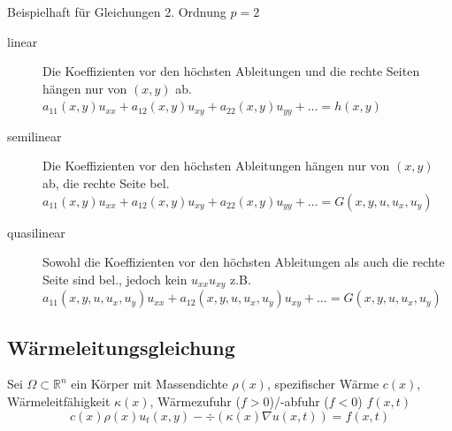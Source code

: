 \begin{sectionbox}
    Beispielhaft für Gleichungen 2. Ordnung $p=2$
    \begin{description}
        \item[linear] Die Koeffizienten vor den höchsten Ableitungen und die rechte Seiten hängen nur von $(x,y)$ ab. \\
              $a_{11}(x,y)u_{xx} + a_{12}(x,y)u_{xy} + a_{22}(x,y)u_{yy} + \dots = h(x,y)$
        \item[semilinear] Die Koeffizienten vor den höchsten Ableitungen hängen nur von $(x,y)$ ab, die rechte Seite bel. \\
              $a_{11}(x,y)u_{xx} + a_{12}(x,y)u_{xy} + a_{22}(x,y)u_{yy} + \dots = G(x,y,u,u_x,u_y)$
        \item[quasilinear] Sowohl die Koeffizienten vor den höchsten Ableitungen als auch die rechte Seite sind bel., jedoch kein $u_{xx}u_{xy}$ z.B. \\
              $a_{11}(x,y,u,u_x,u_y)u_{xx} + a_{12}(x,y,u,u_x,u_y)u_{xy} + \dots = G(x,y,u,u_x,u_y)$
    \end{description}
\end{sectionbox}

\subsection{Wärmeleitungsgleichung}
\begin{emphbox}
    Sei $\Omega\subset\mathbb R^n$ ein Körper mit Massendichte $\rho(x)$, spezifischer Wärme $c(x)$, Wärmeleitfähigkeit $\kappa(x)$, Wärmezufuhr ($f>0$)/-abfuhr ($f<0$) $f(x,t)$
    \begin{equation*}
        c(x)\rho(x)u_t(x,y) - \div(\kappa(x)\nabla u(x,t)) = f(x,t)
    \end{equation*}
\end{emphbox}

